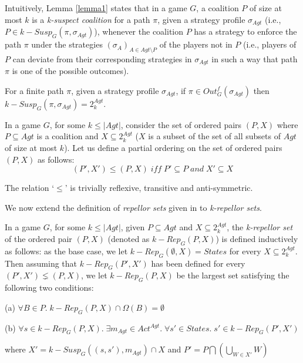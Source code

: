 Intuitively, Lemma \ref{lemma1} states that in a game $G$, a coalition $P$ of size at most $k$ is a \textit{k-suspect coalition} for a path $\pi$, given a strategy profile $\sigma_{Agt}$ (i.e., $P \in k-Susp_{G}(\pi, \sigma_{Agt})$), whenever the coalition $P$ has a strategy to enforce the path $\pi$ under the strategies $(\sigma_{A})_{A\in Agt\setminus P}$ of the players not in $P$ (i.e., players of $P$ can deviate from their corresponding strategies in $\sigma_{Agt}$ in such a way that path $\pi$ is one of the possible outcomes).

\begin{remark}
For a finite path $\pi$, given a strategy profile $\sigma_{Agt}$, if $\pi \in Out_{G}^{f}(\sigma_{Agt})$ then $k-Susp_{G}(\pi, \sigma_{Agt}) = 2^{Agt}_{k}$.
\end{remark}

In a game $G$, for some $k \leq \vert Agt \vert$, consider the set of ordered pairs $(P, X)$ where $P \subseteq Agt$ is a coalition and $X \subseteq 2^{Agt}_{k}$ ($X$ is a subset of the set of all subsets of $Agt$ of size at most $k$). Let us define a partial ordering on the set of ordered pairs $(P, X)$ as follows:
\[(P', X') \leq (P, X) \; \textit{iff} \; P' \subseteq P \; \textit{and} \; X' \subseteq X\]

The relation `$\leq$' is trivially reflexive, transitive and anti-symmetric.

We now extend the definition of \textit{repellor sets} given in \cite{BBM-concur10,BBM-report,BBMU-fsttcs11} to \textit{k-repellor sets}.

\begin{definition}
\label{k-rep}
In a game $G$, for some $k \leq \vert Agt \vert$, given $P \subseteq Agt$ and $X \subseteq 2^{Agt}_{k}$, the \textit{k-repellor set} of the ordered pair $(P, X)$ (denoted as $k-Rep_{G}(P, X)$) is defined inductively as follows: as the base case, we let $k-Rep_{G}(\emptyset, X) = States$ for every $X \subseteq 2^{Agt}_{k}$. Then assuming that $k-Rep_{G}(P', X')$ has been defined for every $(P', X') \lneq (P, X)$, we let $k-Rep_{G}(P, X)$ be the largest set satisfying the following two conditions:

(a) $\forall B \in P. \; k-Rep_{G}(P, X) \cap \Omega(B) = \emptyset$

(b) $\forall s \in k-Rep_{G}(P, X). \; \exists m_{Agt} \in Act^{Agt}. \; \forall s' \in States. \; s' \in k-Rep_{G}(P', X')$

where $X' = k-Susp_{G}((s, s'), m_{Agt}) \cap X$ and $P' = P \bigcap \left( \bigcup \limits_{W \in X'}W \right)$
\end{definition}

